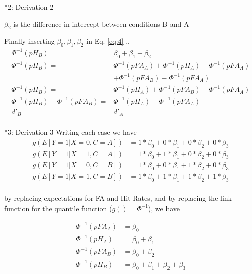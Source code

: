 \documentclass[10pt]{beamer}
\begin{document}
\begin{frame}{*2: Derivation 2}

$\beta_2$ is the difference in intercept between conditions B and A\\

\vspace{10pt}

Finally inserting $\beta_0, \beta_1, \beta_2$ in Eq. \autoref{eq:4} ..
\begin{align*}
\Phi^{-1}(pH_{B}) = & \beta_0 + \beta_1 + \beta_2\\
\Phi^{-1}(pH_{B}) = & \Phi^{-1}(pFA_{A}) + \Phi^{-1}(pH_{A}) - \Phi^{-1}(pFA_{A}) \\
& + \Phi^{-1}(pFA_{B}) - \Phi^{-1}(pFA_{A})\\
\Phi^{-1}(pH_{B}) = & \Phi^{-1}(pH_{A}) + \Phi^{-1}(pFA_{B}) - \Phi^{-1}(pFA_{A})\\
\Phi^{-1}(pH_{B}) - \Phi^{-1}(pFA_{B}) = & \Phi^{-1}(pH_{A}) - \Phi^{-1}(pFA_{A})\\
d'_B = & d'_A\\
\end{align*}
\end{frame}


\begin{frame}{*3: Derivation 3}
Writing each case we have 
\begin{align*}
g(E[Y=1| X=0, C=A]) & = 1* \beta_0 + 0 * \beta_1 + 0* \beta_2 +  0* \beta_3 \\
g(E[Y=1| X=1, C=A]) & = 1* \beta_0 + 1 * \beta_1 + 0* \beta_2 +  0* \beta_3 \\
g(E[Y=1| X=0, C=B]) & = 1* \beta_0 + 0 * \beta_1 + 1* \beta_2 +  0* \beta_3 \\
g(E[Y=1| X=1, C=B]) & = 1* \beta_0 + 1 * \beta_1 + 1* \beta_2 +  1* \beta_3 \\
\end{align*}

by replacing expectations for FA and Hit Rates, and by replacing the link function for the quantile function ($g() = \Phi^{-1}$), we have

\begin{align}
\Phi^{-1}(pFA_{A}) & = \beta_0 \label{eq:c1}\\
\Phi^{-1}(pH_{A}) & = \beta_0 + \beta_1 \label{eq:c2}\\
\Phi^{-1}(pFA_{B}) & = \beta_0 + \beta_2  \label{eq:c3}\\
\Phi^{-1}(pH_{B}) & = \beta_0 + \beta_1 + \beta_2 +  \beta_3\label{eq:c4}
\end{align}
\end{frame}
\end{document}
